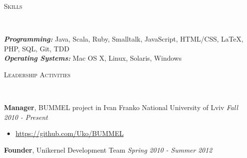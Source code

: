 \documentclass[9pt]{article}
\newenvironment{changemargin}[2]{%
  \begin{list}{}{%
    \setlength{\topsep}{0pt}%
    \setlength{\leftmargin}{#1}%
    \setlength{\rightmargin}{#2}%
    \setlength{\listparindent}{\parindent}%
    \setlength{\itemindent}{\parindent}%
    \setlength{\parsep}{\parskip}%
  }%
  \item[]}{\end{list}
}
\newcommand{\lineover}{
	\begin{changemargin}{-0.05in}{-0.05in}
		\vspace*{-8pt}
		\hrulefill \\
		\vspace*{-2pt}
	\end{changemargin}
}
\newcommand{\header}[1]{
	\begin{changemargin}{-0.5in}{-0.5in}
		\scshape{#1}\\
  	\lineover
	\end{changemargin}
}
\newenvironment{body} {
	\vspace*{-16pt}
	\begin{changemargin}{-0.25in}{-0.5in}
  }	
	{\end{changemargin}
}
\begin{document}
\smallskip


\header{Skills}

\begin{body}
	\vspace{14pt}
	\emph{\textbf{Programming:}}{} Java, Scala, Ruby, Smalltalk, JavaScript, HTML/CSS, \LaTeX, PHP, SQL, Git, TDD\\
	\medskip
	\emph{\textbf{Operating Systems:}}{} Mac OS X, Linux, Solaris, Windows\\
\end{body}

\smallskip


\header{Leadership Activities}

\begin{body}
	\vspace{14pt}
	\textbf{Manager}, BUMMEL project in Ivan Franko National University of Lviv \hfill{} \emph{Fall 2010 - Present}\\
	\vspace*{-4pt}
	\begin{itemize} \itemsep -0pt
		\item \url{https://github.com/Uko/BUMMEL}
	\end{itemize}
	\smallskip
	\textbf{Founder}, Unikernel Development Team \hfill {} \emph{Spring 2010 - Summer 2012}\\
\end{body}
\end{document}
